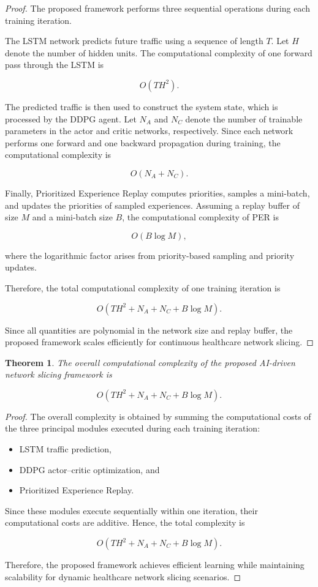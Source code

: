 \documentclass[10pt,journal,compsoc]{IEEEtran}
\newtheorem{theorem}{Theorem}
\begin{document}
\begin{proof}
The proposed framework performs three sequential operations during each training iteration.

The LSTM network predicts future traffic using a sequence of length $T$. Let $H$ denote the number of hidden units. The computational complexity of one forward pass through the LSTM is

\[
O(TH^{2}).
\]

The predicted traffic is then used to construct the system state, which is processed by the DDPG agent. Let $N_A$ and $N_C$ denote the number of trainable parameters in the actor and critic networks, respectively. Since each network performs one forward and one backward propagation during training, the computational complexity is

\[
O(N_A+N_C).
\]

Finally, Prioritized Experience Replay computes priorities, samples a mini-batch, and updates the priorities of sampled experiences. Assuming a replay buffer of size $M$ and a mini-batch size $B$, the computational complexity of PER is

\[
O(B\log M),
\]

where the logarithmic factor arises from priority-based sampling and priority updates.

Therefore, the total computational complexity of one training iteration is

\[
O\!\left(
TH^{2}
+
N_A
+
N_C
+
B\log M
\right).
\]

Since all quantities are polynomial in the network size and replay buffer, the proposed framework scales efficiently for continuous healthcare network slicing.
\end{proof}

\begin{theorem}
\label{theorem_total}
The overall computational complexity of the proposed AI-driven network slicing framework is

\[
O\!\left(
TH^{2}
+
N_A
+
N_C
+
B\log M
\right).
\]

\end{theorem}

\begin{proof}
The overall complexity is obtained by summing the computational costs of the three principal modules executed during each training iteration:

\begin{itemize}
\item LSTM traffic prediction,
\item DDPG actor--critic optimization, and
\item Prioritized Experience Replay.
\end{itemize}

Since these modules execute sequentially within one iteration, their computational costs are additive. Hence, the total complexity is

\[
O\!\left(
TH^{2}
+
N_A
+
N_C
+
B\log M
\right).
\]

Therefore, the proposed framework achieves efficient learning while maintaining scalability for dynamic healthcare network slicing scenarios.
\end{proof}
\end{document}
